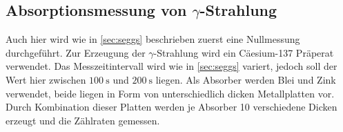\subsection{\texorpdfstring{Absorptionsmessung von $\gamma$-Strahlung}{Absorptionsmessung von Gamma-Strahlung}}
Auch hier wird wie in \ref{sec:seggs} beschrieben zuerst eine Nullmessung durchgeführt.
Zur Erzeugung der $\gamma$-Strahlung wird ein Cäesium-137 Präperat verwendet.
Das Messzeitintervall wird wie in \ref{sec:seggs} variert, jedoch soll der Wert hier zwischen
$\qty{100}{\second}$ und $\qty{200}{\second}$ liegen.
Als Absorber werden Blei und Zink verwendet, beide liegen in Form von unterschiedlich dicken Metallplatten vor.
Durch Kombination dieser Platten werden je Absorber 10 verschiedene Dicken erzeugt und die Zählraten gemessen.